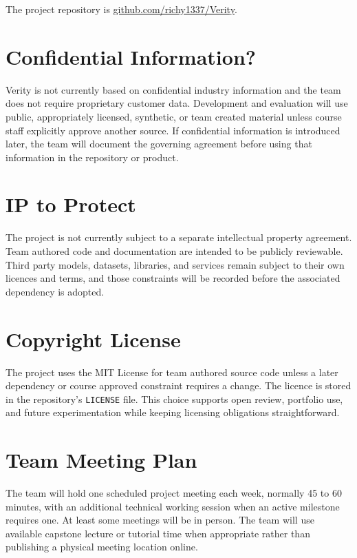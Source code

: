\documentclass{article}
\begin{document}
The project repository is \href{https://github.com/richy1337/Verity}{github.com/richy1337/Verity}.

\section{Confidential Information?}

Verity is not currently based on confidential industry information and the team does not require proprietary customer data. Development and evaluation will use public, appropriately licensed, synthetic, or team created material unless course staff explicitly approve another source. If confidential information is introduced later, the team will document the governing agreement before using that information in the repository or product.

\section{IP to Protect}

The project is not currently subject to a separate intellectual property agreement. Team authored code and documentation are intended to be publicly reviewable. Third party models, datasets, libraries, and services remain subject to their own licences and terms, and those constraints will be recorded before the associated dependency is adopted.

\section{Copyright License}

The project uses the MIT License for team authored source code unless a later dependency or course approved constraint requires a change. The licence is stored in the repository's \texttt{LICENSE} file. This choice supports open review, portfolio use, and future experimentation while keeping licensing obligations straightforward.

\section{Team Meeting Plan}

The team will hold one scheduled project meeting each week, normally 45 to 60 minutes, with an additional technical working session when an active milestone requires one. At least some meetings will be in person. The team will use available capstone lecture or tutorial time when appropriate rather than publishing a physical meeting location online.
\end{document}
